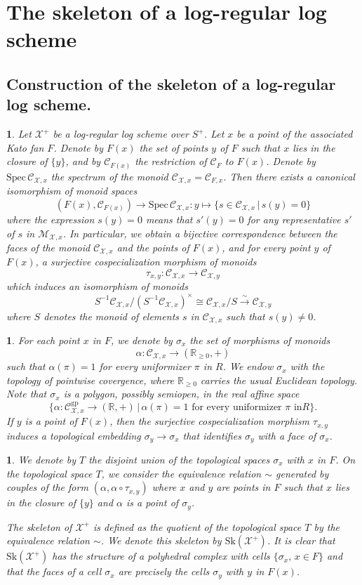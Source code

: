 \documentclass{amsart}%
\numberwithin{equation}{subsection}
\theoremstyle{plain2}
\theoremstyle{definition2}
\theoremstyle{stepstyle}
\theoremstyle{point}
\theoremstyle{subpoint}
\newtheorem{subpoint}[equation]{}%
\newcommand{\spa}[1]{\begin{subpoint}#1\end{subpoint}}           %
\newcommand{\R}{\ensuremath{\mathbb{R}}}
\newcommand{\cX}{\ensuremath{\mathscr{X}}}
\renewcommand{\R}{\ensuremath{\mathbb{R}}}
\newcommand{\Spec}{\ensuremath{\mathrm{Spec}\,}}
\newcommand{\Sk}{\mathrm{Sk}}
\newcommand{\gp}{\mathrm{gp}}
\begin{document}
\section{The skeleton of a log-regular log scheme} \label{sect skeleton log}
\subsection{Construction of the skeleton of a log-regular log scheme.}

\spa{Let $\cX^+$ be a log-regular log scheme over $S^+$. Let $x$ be a point of the associated Kato fan $F$. Denote by $F(x)$ the set of points
$y$ of $F$ such that $x$ lies in the closure of $\{y\}$, and by
$\mathcal{C}_{F(x)}$ the restriction of $\mathcal{C}_F$ to $F(x)$.
Denote
 by $\Spec \mathcal{C}_{\cX,x}$ the spectrum of the monoid
$\mathcal{C}_{\cX,x}=\mathcal{C}_{F,x}$. Then there exists a
canonical isomorphism of
 monoid spaces
$$(F(x),\mathcal{C}_{F(x)})\to \Spec \mathcal{C}_{\cX,x}:y\mapsto \{s\in \mathcal{C}_{\cX,x}\,|\,s(y)= 0\}$$ where the expression $s(y)= 0$ means that $s'(y)= 0$ for any representative $s'$ of $s$ in $\mathcal{M}_{\cX,x}$. In particular, we obtain a bijective correspondence between the faces of the monoid $\mathcal{C}_{\cX,x}$ and the points of $F(x)$, and for every point $y$ of $F(x)$, a surjective cospecialization morphism of monoids $$\tau_{x,y}:\mathcal{C}_{\cX,x}\to \mathcal{C}_{\cX,y}$$ which induces an isomorphism of monoids $$S^{-1}\mathcal{C}_{\cX,x}/(S^{-1}\mathcal{C}_{\cX,x})^{\times}\cong \mathcal{C}_{\cX,x}/S \xrightarrow{\sim}
 \mathcal{C}_{\cX,y}$$ where $S$ denotes the monoid of elements $s$ in $\mathcal{C}_{\cX,x}$ such that $s(y)\neq 0$.}

\spa{For each point $x$ in $F$, we denote by $\sigma_x$ the set of morphisms of monoids $$\alpha:\mathcal{C}_{\cX,x}\to (\R_{\geq 0},+)$$ such that $\alpha(\pi)=1$ for every uniformizer $\pi$ in $R$. We endow $\sigma_x$ with the topology of pointwise covergence, where $\R_{\geq 0}$ carries the usual Euclidean topology. Note that $\sigma_x$ is a polygon, possibly semiopen, in the real affine space
$$\{\alpha:\mathcal{C}^{\gp}_{\cX,x}\to (\R,+)\,|\,\alpha(\pi)=1\mbox{ for every uniformizer }\pi\mbox{ in
}R\}.$$ If $y$ is a point of $F(x)$, then the surjective
cospecialization morphism $\tau_{x,y}$ induces a topological
embedding $\sigma_y\to \sigma_x$ that identifies $\sigma_y$ with a face of $\sigma_x$.}

\spa{We denote by $T$ the disjoint union of the topological
spaces $\sigma_x$ with $x$ in $F$. On the topological space $T$, we consider the equivalence relation $\sim$ generated by couples of the form $(\alpha,\alpha\circ \tau_{x,y})$ where $x$ and $y$ are points in $F$ such that $x$ lies in the closure of $\{y\}$ and $\alpha$ is a point of $\sigma_y$.

The skeleton of $\cX^+$ is defined as the quotient of the topological space $T$ by the equivalence relation $\sim$. We denote this skeleton by $\Sk(\cX^+)$. It is clear that $\Sk(\cX^+)$ has the structure of a polyhedral complex with cells $\{\sigma_x,\,x\in F\}$ and that the faces of a cell $\sigma_x$ are precisely the cells $\sigma_y$ with $y$ in $F(x)$. 
}
\end{document}
